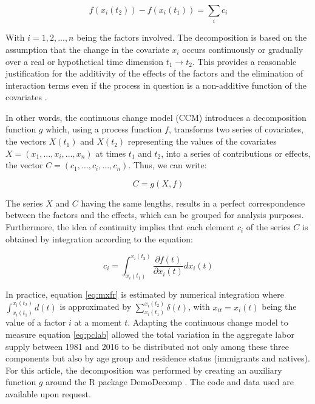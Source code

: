   \begin{equation} \label{eq:hofr}
    f(x_i(t_2)) - f(x_i(t_1)) = \displaystyle\sum_{i}c_{i}
  \end{equation}
  
  \vspace{0.7em}\par
  With \(i = 1, 2, ..., n\) being the factors involved. The decomposition is based on the assumption that the change in the covariate \(x_i\) occurs continuously or gradually over a real or hypothetical time dimension \(t_1 \rightarrow t_2\). This provides a reasonable justification for the additivity of the effects of the factors and the elimination of interaction terms even if the process in question is a non-additive function of the covariates \citep[p.~786]{horiuchiDecompositionMethodBased2008}.
  
  \vspace{0.7em}\par
  In other words, the continuous change model (CCM) introduces a decomposition function \(g\) which, using a process function \(f\), transforms two series of covariates, the vectors \(X(t_1)\) and \(X(t_2)\) representing the values of the covariates \(X = (x_1, ..., x_i, ..., x_n)\) at times \(t_1\) and \(t_2\), into a series of contributions or effects, the vector \(C = (c_1, ..., c_i, ..., c_n)\). Thus, we can write:
  
  \begin{equation}\label{eq:gfr}
    C = g(X, f)
  \end{equation}
  
  The series \(X\) and \(C\) having the same lengths, results in a perfect correspondence between the factors and the effects, which can be grouped for analysis purposes. Furthermore, the idea of continuity implies that each element \(c_i\) of the series \(C\) is obtained by integration according to the equation:
  
  \begin{equation}\label{eq:mxfr}
    c_i = \int_{x_i(t_1)}^{x_i(t_2)} \frac{\partial f(t)}{\partial x_i(t)} dx_i(t)
  \end{equation}
  
  In practice, equation \eqref{eq:mxfr} is estimated by numerical integration where \(\int_{x_i(t_1)}^{x_i(t_2)} d(t)\) is approximated by \(\sum_{x_i(t_1)}^{x_i(t_2)} \delta(t)\), with \(x_{it} = x_i(t)\) being the value of a factor \(i\) at a moment \(t\). Adapting the continuous change model to measure equation \eqref{eq:pclab} allowed the total variation in the aggregate labor supply between 1981 and 2016 to be distributed not only among these three components but also by age group and residence status (immigrants and natives). For this article, the decomposition was performed by creating an auxiliary function \(g\) around the R package \citep{Rstat:2018} DemoDecomp \citep{DemoDecomp:2018}. The code and data used are available upon request.
  
